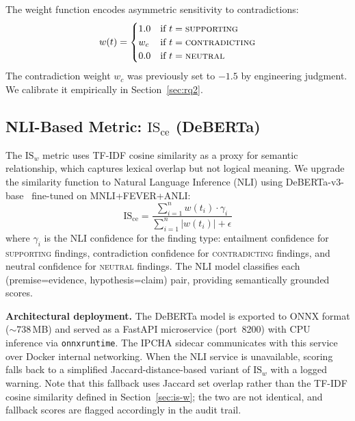 \documentclass[11pt,a4paper]{article}
\begin{document}
The weight function encodes asymmetric sensitivity to contradictions:
\begin{equation}\label{eq:weights}
  w(t) = \begin{cases}
    1.0  & \text{if } t = \textsc{supporting} \\
    w_c  & \text{if } t = \textsc{contradicting} \\
    0.0  & \text{if } t = \textsc{neutral}
  \end{cases}
\end{equation}
The contradiction weight $w_c$ was previously set to $-1.5$ by
engineering judgment.  We calibrate it empirically in
Section~\ref{sec:rq2}.

\subsection{NLI-Based Metric: \texorpdfstring{$\mathrm{IS_{ce}}$}{ISce}
  (DeBERTa)}\label{sec:is-ce}

The $\mathrm{IS}_w$ metric uses TF-IDF cosine similarity as a proxy
for semantic relationship, which captures lexical overlap but not
logical meaning.  We upgrade the similarity function to Natural
Language Inference (NLI) using DeBERTa-v3-base~\cite{he2021deberta}
fine-tuned on MNLI+FEVER+ANLI:
\begin{equation}\label{eq:is-ce}
  \mathrm{IS_{ce}}
  = \frac{\displaystyle\sum_{i=1}^{n} w(t_i)\cdot \gamma_i}
         {\displaystyle\sum_{i=1}^{n} |w(t_i)| + \epsilon}
\end{equation}
where $\gamma_i$ is the NLI confidence for the finding type:
entailment confidence for \textsc{supporting} findings, contradiction
confidence for \textsc{contradicting} findings, and neutral confidence
for \textsc{neutral} findings.  The NLI model classifies each
(premise=evidence, hypothesis=claim) pair, providing semantically
grounded scores.

\textbf{Architectural deployment.}  The DeBERTa model is exported
to ONNX format (${\sim}738$\,MB) and served as a FastAPI microservice
(port~8200) with CPU inference via \texttt{onnxruntime}.  The IPCHA
sidecar communicates with this service over Docker internal
networking.  When the NLI service is unavailable, scoring falls back
to a simplified Jaccard-distance-based variant of
$\mathrm{IS}_w$ with a logged warning.  Note that this
fallback uses Jaccard set overlap rather than the TF-IDF
cosine similarity defined in Section~\ref{sec:is-w}; the
two are not identical, and fallback scores are flagged
accordingly in the audit trail.
\end{document}
